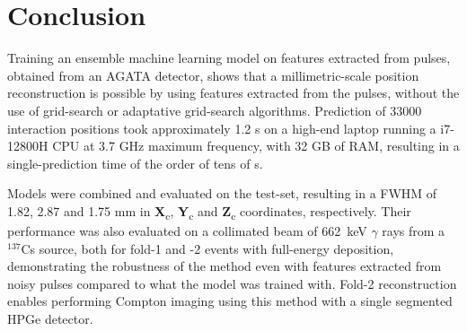 

\section{Conclusion}
Training an ensemble machine learning model on features extracted from pulses, obtained from an AGATA detector, shows that a millimetric-scale position reconstruction is possible by using features extracted from the pulses, without the use of grid-search or adaptative grid-search algorithms. Prediction of 33000 interaction positions took approximately 1.2 s on a high-end laptop running a i7-12800H CPU at 3.7 GHz maximum frequency, with 32 GB of RAM, resulting in a single-prediction time of the order of tens of \textmu s.

Models were combined and evaluated on the test-set, resulting in a FWHM of 1.82, 2.87 and 1.75 mm in \textbf{X}\textsubscript{c}, \textbf{Y}\textsubscript{c} and \textbf{Z}\textsubscript{c} coordinates, respectively. Their performance was also evaluated on a collimated beam of 662~keV $\gamma$ rays from a $^{137}$Cs source, both for fold-1 and -2 events with full-energy deposition, demonstrating the robustness of the method even with features extracted from noisy pulses compared to what the model was trained with. Fold-2 reconstruction enables performing Compton imaging using this method with a single segmented HPGe detector.

%
%
